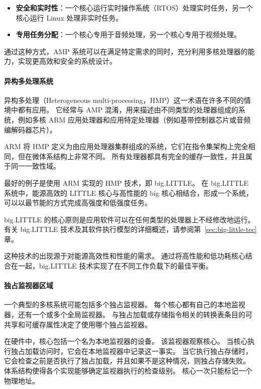 
\begin{itemize}

\item
  \textbf{安全和实时性}：一个核心运行实时操作系统（RTOS）处理实时任务，另一个核心运行 Linux 处理非实时任务。
\item
  \textbf{专用任务分配}：一个核心专用于音频处理，另一个核心专用于视频处理。
\end{itemize}

通过这种方式，AMP 系统可以在满足特定需求的同时，充分利用多核处理器的能力，实现更高效和安全的系统设计。

\paragraph{异构多处理系统}

异构多处理（Heterogeneous multi-processing，HMP）这一术语在许多不同的情境中都有应用。
它经常与 AMP 混淆，用来描述由不同类型的处理器组成的系统，例如多核 ARM 应用处理器和应用特定处理器（例如基带控制器芯片或音频编解码器芯片）。

ARM 将 HMP 定义为由应用处理器集群组成的系统，它们在指令集架构上完全相同，但在微体系结构上非常不同。
所有处理器都具有完全的缓存一致性，并且属于同一一致性域。

最好的例子是使用 ARM 实现的 HMP 技术，即 big.LITTLE。
在 big.LITTLE 系统中，能源高效的 LITTLE 核心与高性能的 big 核心相结合，形成一个系统，可以以最节能的方式完成高强度和低强度任务。


big.LITTLE 的核心原则是应用软件可以在任何类型的处理器上不经修改地运行。
有关 big.LITTLE 技术及其软件执行模型的详细概述，请参阅第~\ref{sec:big-little-tec} 章。

这种技术的出现源于对能源高效性和性能的需求。
通过将高性能和低功耗核心结合在一起，big.LITTLE 技术实现了在不同工作负载下的最佳平衡。

\paragraph{独占监视器区域}

一个典型的多核系统可能包括多个独占监视器。
每个核心都有自己的本地监视器，还有一个或多个全局监视器。
与独占加载或存储指令相关的转换表条目的可共享和可缓存属性决定了使用哪个独占监视器。

在硬件中，核心包括一个名为本地监视器的设备。
该监视器观察核心。
当核心执行独占加载访问时，它会在本地监视器中记录这一事实。
当它执行独占存储时，它会检查之前是否执行了独占加载，并且如果不是这种情况，则独占存储失败。
体系结构使得各个实现能够确定监视器执行的检查级别。
核心一次只能标记一个物理地址。

